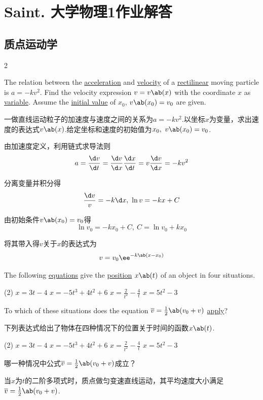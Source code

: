 \chapter{Saint. 大学物理1作业解答}
\section{质点运动学}
{
\begin{multicols}{2}
\begin{problem}
    The relation between the \underline{acceleration} and \underline{velocity} of a \underline{rectilinear} moving particle is $a=-kv^2$. Find the velocity expression $v=v\ab(x)$ with the coordinate $x$ as \underline{variable}. Assume the \underline{initial value} of $x_0$, $v\ab(x_0)=v_0$ are given.
\end{problem}
\begin{translation}
    一做直线运动粒子的加速度与速度之间的关系为$a=-kv^2$.以坐标$x$为变量，求出速度的表达式$v\ab(x)$.给定坐标和速度的初始值为$x_0,\ v\ab(x_0)=v_0$.
\end{translation}
\begin{solution}
    由加速度定义，利用链式求导法则
    $$a=\frac{\d v}{\d t}=\frac{\d v}{\d x}\frac{\d x}{\d t}=v\frac{\d v}{\d x}=-kv^2$$

    分离变量并积分得
    $$\frac{\d v}{v}=-k\d x,\ \ln{v}=-kx+C$$

    由初始条件$v\ab(x_0)=v_0$得
    $$\ln{v_0}=-kx_0+C,\ C=\ln{v_0}+kx_0$$

    将其带入得$v$关于$x$的表达式为
    $$v=v_0\ee^{-k\ab(x-x_0)}$$
\end{solution}

\begin{problem}
    The following \underline{equations} give the \underline{position} $x\ab(t)$ of an object in four situations.
    \begin{tasks}(2)
        \task $x=3t-4$
        \task $x=-5t^3+4t^2+6$
        \task $x=\frac{2}{t^2}-\frac{4}{t}$
        \task $x=5t^2-3$
    \end{tasks}
    To which of these situations does the equation $\overline{v}=\frac{1}{2}\ab(v_0+v)$ \underline{apply}?
\end{problem}
\begin{translation}
    下列表达式给出了物体在四种情况下的位置关于时间的函数$x\ab(t)$.
    \begin{tasks}(2)
        \task $x=3t-4$
        \task $x=-5t^3+4t^2+6$
        \task $x=\frac{2}{t^2}-\frac{4}{t}$
        \task $x=5t^2-3$
    \end{tasks}
    哪一种情况中公式$\overline{v}=\frac{1}{2}\ab(v_0+v)$成立？
\end{translation}
\begin{solution}
    当$x$为$t$的二阶多项式时，质点做匀变速直线运动，其平均速度大小满足$\overline{v}=\frac{1}{2}\ab(v_0+v)$.
\end{solution}


\end{multicols}}
